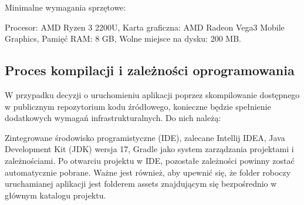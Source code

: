 Minimalne wymagania sprzętowe:

Procesor: AMD Ryzen 3 2200U,
Karta graficzna: AMD Radeon Vega3 Mobile Graphics,
Pamięć RAM: 8 GB,
Wolne miejsce na dysku: 200 MB.
\subsection{Proces kompilacji i zależności oprogramowania}
W przypadku decyzji o uruchomieniu aplikacji poprzez skompilowanie dostępnego w publicznym repozytorium kodu źródłowego, konieczne będzie spełnienie dodatkowych wymagań infrastrukturalnych. Do nich należą:

Zintegrowane środowisko programistyczne (IDE), zalecane Intellij IDEA,
Java Development Kit (JDK) wersja 17,
Gradle jako system zarządzania projektami i zależnościami.
Po otwarciu projektu w IDE, pozostałe zależności powinny zostać automatycznie pobrane. Ważne jest również, aby upewnić się, że folder roboczy uruchamianej aplikacji jest folderem assets znajdującym się bezpośrednio w głównym katalogu projektu.






